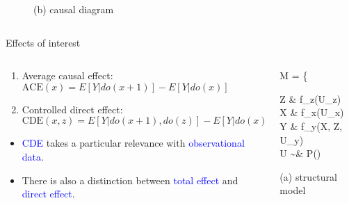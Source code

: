 \begin{frame}
\begin{columns}
\begin{column}{0.5\textwidth}
\begin{figure}
				\caption*{(b) causal diagram}
			\end{figure}
		\end{column}
	\end{columns}
\end{frame}
%
%
\begin{frame}
	{Effects of interest}
	\begin{columns}
		\begin{column}{0.5\textwidth}
			\begin{enumerate}
				\item Average causal effect: \\
				$\text{ACE}(x) = E[Y | do(x + 1)] - E[Y | do(x)]$
				\item Controlled direct effect: \\
				$\text{CDE}(x, z) = E[Y | do(x + 1), do(z)] - E[Y | do(x), do(z)]$
			\end{enumerate}
			\begin{itemize}
				\item \textcolor{blue}{CDE} takes a particular relevance with \textcolor{blue}{observational data}.
				\item There is also a distinction between \textcolor{blue}{total effect} and \textcolor{blue}{direct effect}.
			\end{itemize}
		\end{column}
		\begin{column}{0.5\textwidth}  
			\begin{equ}
				M = \left\{ \begin{aligned} 
					Z \leftarrow & \; f_{z}(U_{z}) \\
					X \leftarrow & \; f_{x}(U_{x}) \\
					Y \leftarrow & \; f_{y}(X, Z, U_{y}) \\
					U \sim & \; P()
				\end{aligned} \right
				\caption*{(a) structural model}
			\end{equ}
			\begin{figure}
\end{figure}
\end{column}
\end{columns}
\end{frame}
